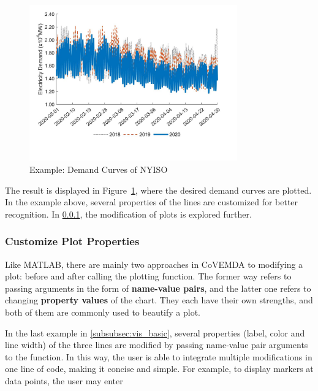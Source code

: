 \documentclass[11pt]{article}
\newcommand{\covemda}{CoVEMDA}
\newcommand{\matlab}{\textsc{MATLAB}}
\numberwithin{equation}{section}
\numberwithin{table}{section}
\numberwithin{figure}{section}
\begin{document}

\begin{figure}
  \centering
  \noindent\includegraphics[width=0.8\textwidth]{figures/visualization_example4.jpg}
  \caption{Example: Demand Curves of NYISO} \label{fig:vis_eg4}
\end{figure}

The result is displayed in Figure~\ref{fig:vis_eg4}, where the desired demand curves are plotted. In the example above, several properties of the lines are customized for better recognition. In \ref{subsubsec:vis_cus}, the modification of plots is explored further.



\subsubsection{Customize Plot Properties} \label{subsubsec:vis_cus}

Like \matlab{}, there are mainly two approaches in \covemda{} to modifying a plot: before and after calling the plotting function. The former way refers to passing arguments in the form of \textbf{name-value pairs}, and the latter one refers to changing \textbf{property values} of the chart. They each have their own strengths, and both of them are commonly used to beautify a plot.

In the last example in \ref{subsubsec:vis_basic}, several properties (label, color and line width) of the three lines are modified by passing name-value pair arguments to the function. In this way, the user is able to integrate multiple modifications in one line of code, making it concise and simple. For example, to display markers at data points, the user may enter
\end{document}
